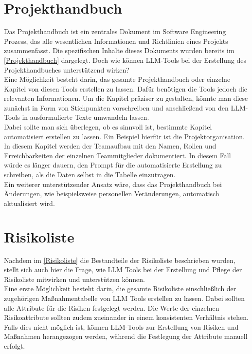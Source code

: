 \section{Projekthandbuch}  \label{LLMProjekthandbuch}

Das Projekthandbuch ist ein zentrales Dokument im Software Engineering Prozess, das alle wesentlichen Informationen und 
Richtlinien eines Projekts zusammenfasst. Die spezifischen Inhalte dieses Dokuments wurden bereits im 
\autoref{Projekthandbuch} dargelegt. Doch wie können LLM-Tools bei der Erstellung des 
Projekthandbuches unterstützend wirken?\\

Eine Möglichkeit besteht darin, das gesamte Projekthandbuch oder einzelne Kapitel von diesen Tools erstellen zu 
lassen. Dafür benötigen die Tools jedoch die relevanten Informationen. Um die Kapitel präziser zu gestalten, könnte 
man diese zunächst in Form von Stichpunkten vorschreiben und anschließend von den LLM-Tools in ausformulierte Texte 
umwandeln lassen.\\
Dabei sollte man sich überlegen, ob es sinnvoll ist, bestimmte Kapitel automatisiert erstellen zu lassen. Ein Beispiel 
hierfür ist die Projektorganisation. In diesem Kapitel werden der Teamaufbau mit den Namen, Rollen und Erreichbarkeiten 
der einzelnen Teammitglieder dokumentiert. In diesem Fall würde es länger dauern, den Prompt für die automatisierte 
Erstellung zu schreiben, als die Daten selbst in die Tabelle einzutragen.\\

Ein weiterer unterstützender Ansatz wäre, dass das Projekthandbuch bei Änderungen, wie beispielsweise personellen 
Veränderungen, automatisch aktualisiert wird.

\section{Risikoliste}  \label{LLMRisikoliste}

Nachdem im \autoref{Risikoliste} die Bestandteile der Risikoliste beschrieben wurden, stellt sich auch hier die Frage, 
wie LLM Tools bei der Erstellung und Pflege der Risikoliste mitwirken und unterstützen können.\\

Eine erste Möglichkeit besteht darin, die gesamte Risikoliste einschließlich der zugehörigen Maßnahmentabelle von 
LLM Tools erstellen zu lassen. Dabei sollten alle Attribute für die Risiken festgelegt werden. Die Werte der einzelnen 
Risikoattribute sollten zudem zueinander in einem konsistenten Verhältnis stehen.\\
Falls dies nicht möglich ist, können LLM-Tools zur Erstellung von Risiken und Maßnahmen herangezogen werden, während 
die Festlegung der Attribute manuell erfolgt.\\

